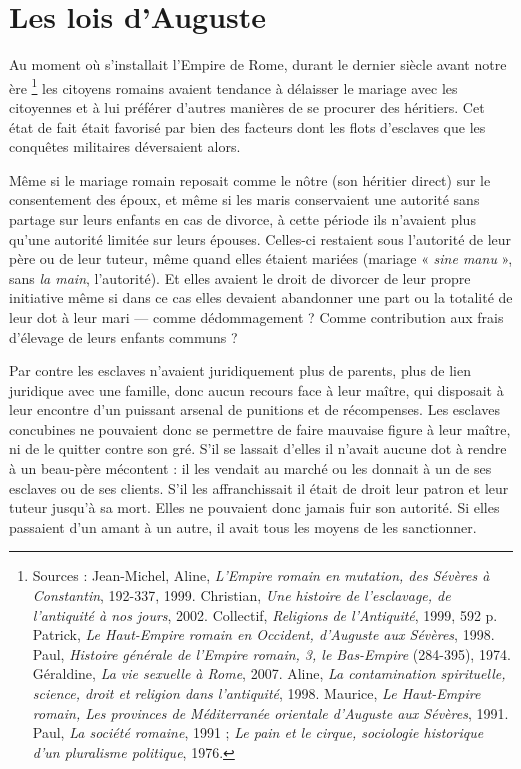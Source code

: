 
\chapter{Les lois d'Auguste}

 Au moment où s'installait l'Empire de Rome, durant le dernier siècle avant notre ère%
\footnote{Sources :  Jean-Michel,  Aline, \emph{L'Empire romain en mutation, des Sévères à Constantin}, 192-337, 1999.  Christian, \emph{Une histoire de l'esclavage, de l'antiquité à nos jours}, 2002. Collectif, \emph{Religions de l'Antiquité}, 1999, 592 p.  Patrick, \emph{Le Haut-Empire romain en Occident, d'Auguste aux Sévères}, 1998.  Paul, \emph{Histoire générale de l'Empire romain, 3, le Bas-Empire} (284-395), 1974.  Géraldine, \emph{La vie sexuelle à Rome}, 2007.  Aline, \emph{La contamination spirituelle, science, droit et religion dans l'antiquité}, 1998.  Maurice, \emph{Le Haut-Empire romain, Les provinces de Méditerranée orientale d'Auguste aux Sévères}, 1991.  Paul, \emph{La société romaine}, 1991 ; \emph{Le pain et le cirque, sociologie historique d'un pluralisme politique}, 1976.}
les citoyens romains avaient tendance à délaisser le mariage avec les citoyennes et à lui préférer d'autres manières de se procurer des héritiers. Cet état de fait était favorisé par bien des facteurs dont les flots d'esclaves que les conquêtes militaires déversaient alors. 

 Même si le mariage romain reposait comme le nôtre (son héritier direct) sur le consentement des époux, et même si les maris conservaient une autorité sans partage sur leurs enfants en cas de divorce, à cette période ils n'avaient plus qu'une autorité limitée sur leurs épouses. Celles-ci restaient sous l'autorité de leur père ou de leur tuteur, même quand elles étaient mariées (mariage « \emph{sine manu} », sans \emph{la main}, l'autorité). Et elles avaient le droit de divorcer de leur propre initiative même si dans ce cas elles devaient abandonner une part ou la totalité de leur dot à leur mari --- comme dédommagement ? Comme contribution aux frais d'élevage de leurs enfants communs ?

 Par contre les esclaves n'avaient juridiquement plus de parents, plus de lien juridique avec une famille, donc aucun recours face à leur maître, qui disposait à leur encontre d'un puissant arsenal de punitions et de récompenses. Les esclaves concubines ne pouvaient donc se permettre de faire mauvaise figure à leur maître, ni de le quitter contre son gré. S'il se lassait d'elles il n'avait aucune dot à rendre à un beau-père mécontent : il les vendait au marché ou les donnait à un de ses esclaves ou de ses clients. S'il les affranchissait il était de droit leur patron et leur tuteur jusqu'à sa mort. Elles ne pouvaient donc jamais fuir son autorité. Si elles passaient d'un amant à un autre, il avait tous les moyens de les sanctionner.

